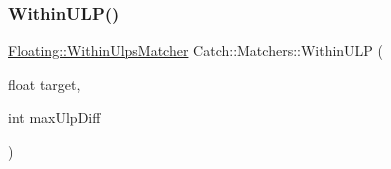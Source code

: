 \mbox{\label{namespace_catch_1_1_matchers_ab87ee77e5349fac450d1e631dee86496}} 
\subsubsection{\texorpdfstring{Within\+U\+L\+P()}{WithinULP()}\hspace{0.1cm}{\footnotesize\ttfamily [2/2]}}
{\footnotesize\ttfamily \mbox{\hyperlink{struct_catch_1_1_matchers_1_1_floating_1_1_within_ulps_matcher}{Floating\+::\+Within\+Ulps\+Matcher}} Catch\+::\+Matchers\+::\+Within\+U\+LP (\begin{DoxyParamCaption}\item[{float}]{target,  }\item[{int}]{max\+Ulp\+Diff }\end{DoxyParamCaption})}

